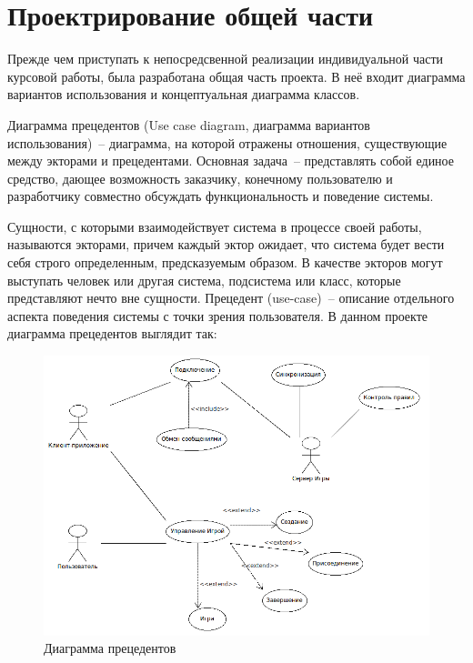 ﻿\section{Проектрирование общей части}
Прежде чем приступать к непосредсвенной реализации индивидуальной части курсовой работы, была разработана
общая часть проекта. В неё входит диаграмма вариантов использования и концептуальная диаграмма классов.

Диаграмма прецедентов (Use case diagram, диаграмма вариантов использования)~-- диаграмма, на которой отражены отношения, 
существующие между экторами и прецедентами.
Основная задача~-- представлять собой единое средство, дающее возможность заказчику, конечному пользователю и разработчику совместно
обсуждать функциональность и поведение системы.

Сущности, с которыми взаимодействует система в процессе своей работы, называются экторами, причем каждый эктор ожидает, 
что система будет вести себя строго определенным, предсказуемым образом. В качестве экторов могут выступать человек или 
другая система, подсистема или класс, которые представляют нечто вне сущности.
Прецедент (use-case)~-- описание отдельного аспекта поведения системы с точки зрения пользователя.
В данном проекте диаграмма прецедентов выглядит так:

\begin{figure}[h]
\centering
\includegraphics[width=18cm]{images/use.png}
\caption{Диаграмма прецедентов}
\label{fig.0}
\end{figure}

